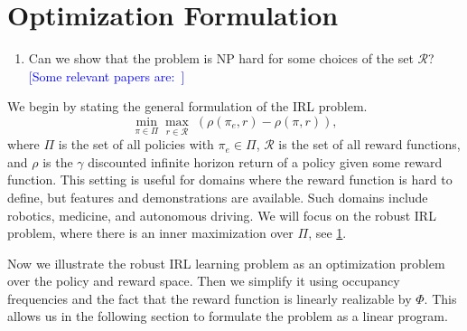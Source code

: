 \documentclass[10pt]{article}
\renewcommand{\cite}{\citep}
\newcommand{\mm}[1]{\textcolor{blue}{[#1]}}
\begin{document}



\section{Optimization Formulation}\label{sec:optimization-formulation}
\begin{enumerate}
	\item Can we show that the problem is NP hard for some choices of the set $\mathcal{R}$? \mm{Some relevant papers are:~\cite{Wu2013,Eldar2008}}
\end{enumerate}

We begin by stating the general formulation of the IRL problem.
\begin{equation}
	\min_{\pi \in \Pi} \max_{r \in \mathcal{R}} \; (\rho(\pi_e, r) - \rho(\pi, r)),
\end{equation}
where $\Pi$ is the set of all policies with $\pi_e \in \Pi$, $\mathcal{R}$ is the set of all reward functions, and $\rho$ is the $\gamma$ discounted infinite horizon
return of a policy given some reward function. This setting is useful for domains where the reward function is hard to define, 
but features and demonstrations are available. Such domains include robotics, medicine, and autonomous driving. 
We will focus on the robust IRL problem, where there is an inner maximization over $\Pi$, see \cref{sec:optimization-formulation}.

Now we illustrate the robust IRL learning problem as an optimization problem over the policy and reward space. Then we simplify it using occupancy frequencies
and the fact that the reward function is linearly realizable by $\Phi$. This allows us in the following section to formulate the problem as a linear program.
\end{document}
